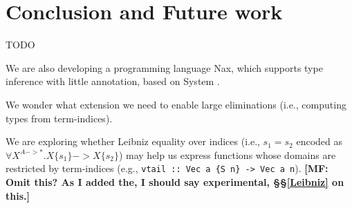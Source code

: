 \section{Conclusion and Future work}
\label{sec:concl}
TODO

We are also developing a programming language Nax, which supports
type inference with little annotation, based on System \Fi.

We wonder what extension
we need to enable large eliminations (i.e., computing types from term-indices).

We are exploring whether Leibniz equality over indices
(i.e., $s_1=s_2$ encoded as $\forall X^{A -> *}.X\{s_1\} -> X\{s_2\}$)
may help us express functions whose domains are restricted by term-indices
(e.g., \verb|vtail :: Vec a {S n} -> Vec a n|).  {\bf [MF: Omit this? As I
	added the, I should say experimental, \S\S\ref{Leibniz} on this.]}

